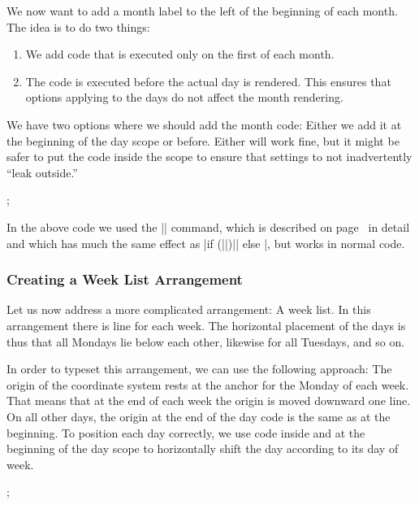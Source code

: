 We now want to add a month label to the left of the beginning of each
month. The idea is to do two things:
\begin{enumerate}
\item We add code that is executed only on the first of each month.
\item The code is executed before the actual day is rendered. This
  ensures that options applying to the days do not affect the month
  rendering.
\end{enumerate}
We have two options where we should add the month code: Either we add
it at the beginning of the day scope or before. Either will work fine,
but it might be safer to put the code inside the scope to ensure that
settings to not inadvertently ``leak outside.''
\begin{codeexample}[]
\tikz
  \calendar
    [dates=2000-01-01 to 2000-01-08,
     execute after day scope={\pgftransformyshift{-1em}},
     execute at begin day scope=
       {\ifdate{day of month=1}{\tikzmonthcode}{}},
     every month/.append style={anchor=base east,xshift=-2em}];
\end{codeexample}

In the above code we used the |\ifdate| command, which is described on
page~\pageref{ifdate} in detail and which has much the same effect as
|if (||)|| else |, but
works in normal code.


\subsubsection{Creating a Week List Arrangement}

Let us now address a more complicated arrangement: A week list. In
this arrangement there is line for each week. The horizontal placement
of the days is thus that all Mondays lie below each other, likewise
for all Tuesdays, and so on.

In order to typeset this arrangement, we can use the following
approach: The origin of the coordinate system rests at the anchor for
the Monday of each week. That means that at the end of each week the
origin is moved downward one line. On all other days, the origin at
the end of the day code is the same as at the beginning. To position
each day correctly, we use code inside and at the beginning of the day
scope to horizontally shift the day according to its day of week.
\begin{codeexample}[]
\tikz
  \calendar
    [dates=2000-01-01 to 2000-01-20,
     execute at begin day scope=
       {\pgftransformxshift{\pgfcalendarcurrentweekday em}},
     execute after day scope=
       {\ifdate{Sunday}{\pgftransformyshift{-1em}}{}}];
\end{codeexample}


